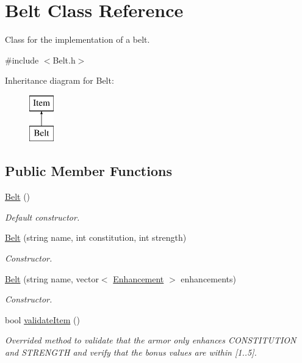 \hypertarget{class_belt}{}\section{Belt Class Reference}
\label{class_belt}


Class for the implementation of a belt.  




{\ttfamily \#include $<$Belt.\+h$>$}

Inheritance diagram for Belt\+:\begin{figure}[H]
\begin{center}
\leavevmode
\includegraphics[height=2.000000cm]{class_belt}
\end{center}
\end{figure}
\subsection*{Public Member Functions}
\begin{DoxyCompactItemize}
\item 
\hypertarget{class_belt_a6dc40c21b5a62c71925df189511d7551}{}\label{class_belt_a6dc40c21b5a62c71925df189511d7551} 
\hyperlink{class_belt_a6dc40c21b5a62c71925df189511d7551}{Belt} ()
\begin{DoxyCompactList}\small\item\em Default constructor. \end{DoxyCompactList}\item 
\hyperlink{class_belt_ab54648057c8b264df3ffb71c4408a546}{Belt} (string name, int constitution, int strength)
\begin{DoxyCompactList}\small\item\em Constructor. \end{DoxyCompactList}\item 
\hyperlink{class_belt_aa29331f3e861aea90a39e5e723ccb562}{Belt} (string name, vector$<$ \hyperlink{class_enhancement}{Enhancement} $>$ enhancements)
\begin{DoxyCompactList}\small\item\em Constructor. \end{DoxyCompactList}\item 
bool \hyperlink{class_belt_ab374477dd9d966e6e6b81b3699afd939}{validate\+Item} ()
\begin{DoxyCompactList}\small\item\em Overrided method to validate that the armor only enhances \textquotesingle{}C\+O\+N\+S\+T\+I\+T\+U\+T\+I\+ON\textquotesingle{} and \textquotesingle{}S\+T\+R\+E\+N\+G\+TH\textquotesingle{} and verify that the bonus values are within \mbox{[}1..5\mbox{]}. \end{DoxyCompactList}\end{DoxyCompactItemize}

